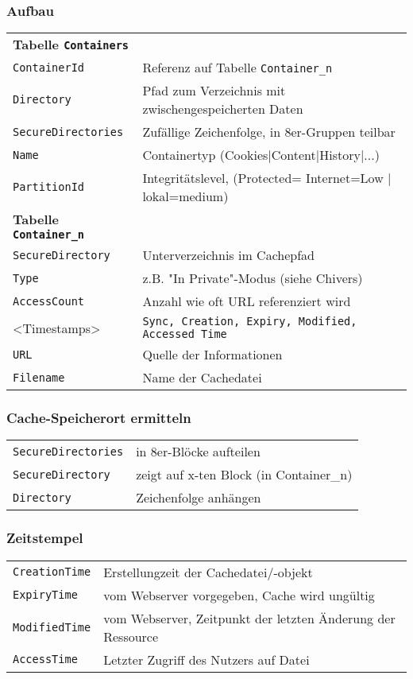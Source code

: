 \subsubsection{Aufbau}
\begin{tabular}{@{}p{\the\MyLen}%
		@{}p{\linewidth-\the\MyLen}@{}}
	\textbf{Tabelle \texttt{Containers}} & \\
	\texttt{ContainerId} & Referenz auf Tabelle \texttt{Container\_n}\\
	\texttt{Directory} & Pfad zum Verzeichnis mit zwischengespeicherten Daten\\
	\texttt{SecureDirectories} & Zufällige Zeichenfolge, in 8er-Gruppen teilbar\\
	\texttt{Name} & Containertyp (Cookies|Content|History|...)\\
	\texttt{PartitionId} & Integritätslevel, (Protected= Internet=Low | lokal=medium)\\
	\textbf{Tabelle \texttt{Container\_n}} & \\
	\texttt{SecureDirectory} & Unterverzeichnis im Cachepfad \\
	\texttt{Type} & z.B. "In Private"-Modus (siehe Chivers)\\
	\texttt{AccessCount} & Anzahl wie oft URL referenziert wird\\
	<Timestamps> & \texttt{Sync, Creation, Expiry, Modified, Accessed Time}\\
	\texttt{URL} & Quelle der Informationen\\
	\texttt{Filename} & Name der Cachedatei\\
\end{tabular}

\subsubsection{Cache-Speicherort ermitteln}
\begin{tabular}{@{}p{\the\MyLen}%
		@{}p{\linewidth-\the\MyLen}@{}}
	\texttt{SecureDirectories} & in 8er-Blöcke aufteilen\\
	\texttt{SecureDirectory} & zeigt auf x-ten Block (in Container\_n)\\
	\texttt{Directory} & Zeichenfolge anhängen\\
\end{tabular}

\subsubsection{Zeitstempel}
\begin{tabular}{@{}p{\the\MyLen}%
		@{}p{\linewidth-\the\MyLen}@{}}
	\texttt{CreationTime} & Erstellungzeit der Cachedatei/-objekt\\
	\texttt{ExpiryTime} & vom Webserver vorgegeben, Cache wird ungültig\\
	\texttt{ModifiedTime} & vom Webserver, Zeitpunkt der letzten Änderung der Ressource\\
	\texttt{AccessTime} & Letzter Zugriff des Nutzers auf Datei\\
\end{tabular}

